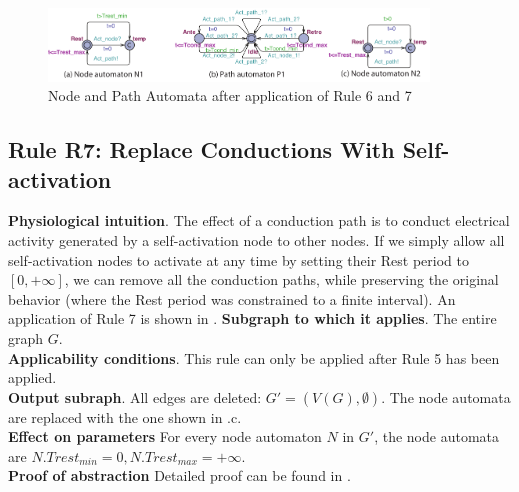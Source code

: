 \begin{figure}[!t]
	\centering
	\includegraphics[width=0.9\textwidth]{figs/rule5.pdf}
	\caption{\small Node and Path Automata after application of Rule 6 and 7}
	\label{fig:rule5}
\end{figure}

\subsection{Rule R7: Replace Conductions With Self-activation}
\textbf{Physiological intuition}. 
The effect of a conduction path is to conduct electrical activity generated by a self-activation node to other nodes. 
If we simply allow all self-activation nodes to activate at any time by setting their Rest period to $[0,+\infty]$, we can remove all the conduction paths, while preserving the original behavior (where the Rest period was constrained to a finite interval).
An application of Rule 7 is shown in .
\textbf{Subgraph to which it applies}.
The entire graph $G$.\\
\textbf{Applicability conditions}.
This rule can only be applied after Rule 5 has been applied.\\
\textbf{Output subraph}.
All edges are deleted: $G' = (V(G), \emptyset)$. The node automata are replaced with the one shown in .c.\\
\textbf{Effect on parameters}
For every node automaton $N$ in $G'$, the node automata are $N.Trest_{min}=0,N.Trest_{max} = +\infty$.\\
\textbf{Proof of abstraction} Detailed proof can be found in \cite{regar_tech}.




